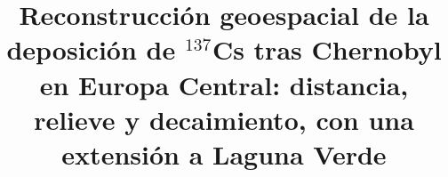 \documentclass[conference]{IEEEtran}
\begin{document}
\renewcommand{\IEEEkeywordsname}{Palabras clave}

\title{Reconstrucci\'on geoespacial de la deposici\'on de $^{137}$Cs tras Chernobyl en Europa Central: distancia, relieve y decaimiento, con una extensi\'on a Laguna Verde}

\author{
}

\maketitle

\end{document}
